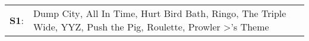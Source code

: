 \begin{supertabular}{p{0.03\textwidth}p{0.92\textwidth}}
 \textbf{S1}:  &  Dump City\textsuperscript{}, \enspace All In Time\textsuperscript{}, \enspace Hurt Bird Bath\textsuperscript{}, \enspace Ringo\textsuperscript{}, \enspace The Triple Wide\textsuperscript{}, \enspace YYZ\textsuperscript{}, \enspace Push the Pig\textsuperscript{}, \enspace Roulette\textsuperscript{}, \enspace Prowler\textsuperscript{} \textgreater {}'s Theme\textsuperscript{}  \enspace  \\
\end{supertabular}
